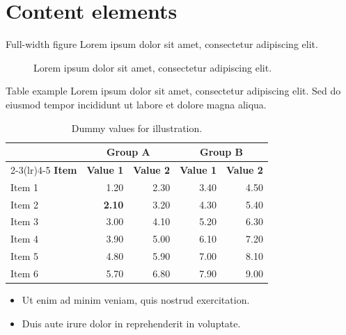 \section{Content elements}

\begin{frame}[t]{Full-width figure}
    Lorem ipsum dolor sit amet, consectetur adipiscing elit.
    \begin{figure}
        \centering
        \caption{Lorem ipsum dolor sit amet, consectetur adipiscing elit.}
    \end{figure}
\end{frame}

\begin{frame}[t]{Table example}
    Lorem ipsum dolor sit amet, consectetur adipiscing elit. Sed do eiusmod
    tempor incididunt ut labore et dolore magna aliqua.
    \begin{table}
        \centering
        \begin{tabular}{lrrrr}
            \toprule
            & \multicolumn{2}{c}{\textbf{Group A}}
            & \multicolumn{2}{c}{\textbf{Group B}} \\
            \cmidrule(lr){2-3}\cmidrule(lr){4-5}
            \textbf{Item} & \textbf{Value 1} & \textbf{Value 2}
                          & \textbf{Value 1} & \textbf{Value 2} \\
            \midrule
            Item 1 & 1.20 & 2.30 & 3.40 & 4.50 \\
            \rowcolor{light-gray}
            Item 2 & \textbf{2.10} & 3.20 & 4.30 & 5.40 \\
            Item 3 & 3.00 & 4.10 & 5.20 & 6.30 \\
            Item 4 & 3.90 & 5.00 & 6.10 & 7.20 \\
            Item 5 & 4.80 & 5.90 & 7.00 & 8.10 \\
            Item 6 & 5.70 & 6.80 & 7.90 & 9.00 \\
            \bottomrule
        \end{tabular}
        \caption{Dummy values for illustration.}
    \end{table}
    \begin{itemize}
        \item Ut enim ad minim veniam, quis nostrud exercitation.
        \item Duis aute irure dolor in reprehenderit in voluptate.
    \end{itemize}
\end{frame}

